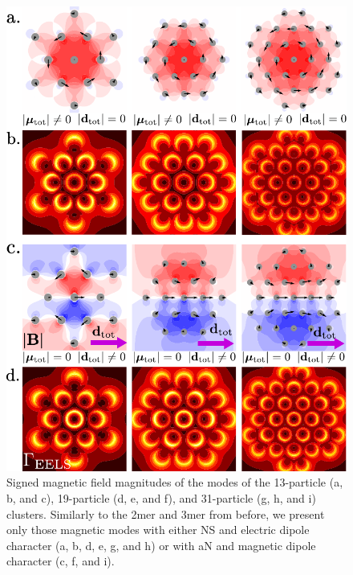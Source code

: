 \documentclass[journal=apchd5,manuscript=article]{achemso}
\begin{document}
\begin{figure}
\includegraphics{fig5.pdf}
\caption{Signed magnetic field magnitudes of the modes of the 13-particle (a, b, and c), 19-particle (d, e, and f), and 31-particle (g, h, and i) clusters. Similarly to the 2mer and 3mer from before, we present only those magnetic modes with either NS and electric dipole character (a, b, d, e, g, and h) or with aN and magnetic dipole character (c, f, and i).}
\label{kagan_fields}
\end{figure}
\end{document}
